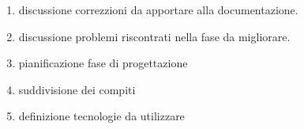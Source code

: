 \begin{enumerate}
    \item discussione correzzioni da apportare alla documentazione.
    \item discussione problemi riscontrati nella fase da migliorare.
    \item pianificazione fase di progettazione
    \item suddivisione dei compiti
    \item definizione tecnologie da utilizzare
\end{enumerate}